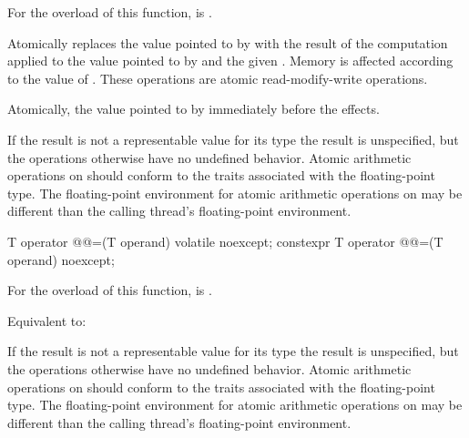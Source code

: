 \begin{itemdescr}
\pnum
\constraints
For the  overload of this function,
 is .

\pnum
\effects
Atomically replaces the value pointed to by 
with the result of the computation applied to the value pointed
to by  and the given .
Memory is affected according to the value of .
These operations are atomic read-modify-write operations.

\pnum
\returns
Atomically, the value pointed to by  immediately before the effects.

\pnum
\remarks
If the result is not a representable value for its type
the result is unspecified, but the operations otherwise have no undefined
behavior. Atomic arithmetic operations on 
should conform to the 
traits associated with the floating-point type.
The floating-point environment for atomic arithmetic operations
on  may be different than the
calling thread's floating-point environment.
\end{itemdescr}

%
%
%
%
\begin{itemdecl}
T operator @@=(T operand) volatile noexcept;
constexpr T operator @@=(T operand) noexcept;
\end{itemdecl}

\begin{itemdescr}
\pnum
\constraints
For the  overload of this function,
 is .

\pnum
\effects
Equivalent to: 

\pnum
\remarks
If the result is not a representable value for its type
the result is unspecified, but the operations otherwise have no undefined
behavior. Atomic arithmetic operations on 
should conform to the 
traits associated with the floating-point type.
The floating-point environment for atomic arithmetic operations
on  may be different than the
calling thread's floating-point environment.
\end{itemdescr}

